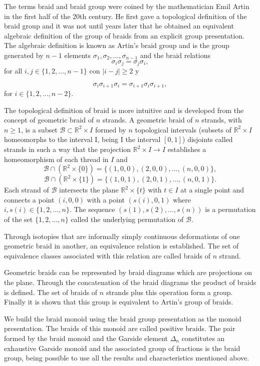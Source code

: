 \documentclass[12pt]{book}
\theoremstyle{definition}
\begin{document}
The terms braid and braid group were coined by the mathematician Emil Artin in the first half of the 20th century. He first gave a topological definition of the braid group and it was not until years later that he obtained an equivalent algebraic definition of the group of braids from an explicit group presentation. The algebraic definition is known as Artin's braid group and is the group generated by $n-1$ elements $\sigma_1, \sigma_2, ..., \sigma_{n-1}$ and the braid relations
$$\sigma_i\sigma_j = \sigma_j\sigma_i,$$
for all $i,j\in\{1,2,...,n-1\}$ con $|i-j|\geq 2$ y

$$\sigma_i\sigma_{i+1}\sigma_i =\sigma_{i+1}\sigma_i\sigma_{i+1},$$
for $i\in\{1,2,...,n-2\}$.

The topological definition of braid is more intuitive and is developed from the concept of geometric braid of $n$ strands. A geometric braid of $n$ strands, with $n\geq 1$, is a subset $\mathcal{B}\subset\mathbb{R}^2\times I$ formed by $n$ topological intervals (subsets of $\mathbb{R}^2\times I$ homeomorphs to the interval I, being I the interval $[0,1]$) disjoints called strands in such a way that the projection $\mathbb{R}^2\times I\rightarrow I$ establishes a homeomorphism of each thread in $I$ and
$$\mathcal{B}\cap(\mathbb{R}^2\times \{0\})=\{(1,0,0),(2,0,0),...,(n,0,0)\},$$
$$\mathcal{B}\cap(\mathbb{R}^2\times \{1\})=\{(1,0,1),(2,0,1),...,(n,0,1)\}.$$
Each strand of $\mathcal {B}$ intersects the plane $\mathbb{R}^2 \times \{t \}$ with $t\in I$ at a single point and connects a point $(i, 0 , 0)$ with a point $(s(i), 0,1)$ where $i, s (i) \in\{1,2, ..., n \} $. The sequence $(s(1), s(2), ..., s(n))$ is a permutation of the set $\{1,2, ..., n\}$ called the underlying permutation of $\mathcal{B}$.

Through isotopies that are informally simply continuous deformations of one geometric braid in another, an equivalence relation is established. The set of equivalence classes associated with this relation are called braids of $n$ strand.

Geometric braids can be represented by braid diagrams which are projections on the plane. Through the concatenation of the braid diagrams the product of braids is defined. The set of braids of $n$ strands plus this operation form a group. Finally it is shown that this group is equivalent to Artin's group of braids.

We build the braid monoid using the braid group presentation as the monoid presentation. The braids of this monoid are called positive braids. The pair formed by the braid monoid and the Garside element $\Delta_n$ constitutes an exhaustive Garside monoid and the associated group of fractions is the braid group, being possible to use all the results and characteristics mentioned above.
\end{document}
